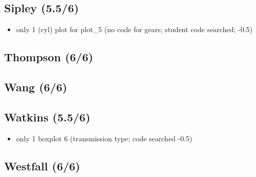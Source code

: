 \documentclass[11pt]{article}
\begin{document}
\subsection{Sipley (5.5/6)}
\label{sec:orgheadline17}
\begin{itemize}
\item only 1 (cyl) plot for plot\_5 (no code for gears; student code searched; -0.5)
\end{itemize}
\subsection{Thompson (6/6)}
\label{sec:orgheadline18}
\subsection{Wang (6/6)}
\label{sec:orgheadline19}
\subsection{Watkins (5.5/6)}
\label{sec:orgheadline20}
\begin{itemize}
\item only 1 boxplot 6 (transmission type; code searched -0.5)
\end{itemize}
\subsection{Westfall (6/6)}
\label{sec:orgheadline21}
\end{document}
